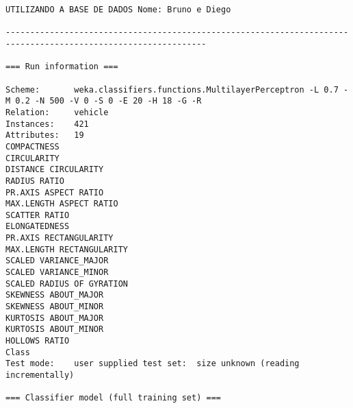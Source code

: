 \documentclass[
	article,			%
	11pt,				%
	oneside,			%
	a4paper,			%
	english,			%
	brazil,				%
	sumario=tradicional
	]{abntex2}
\begin{document}
\begin{lstlisting}
UTILIZANDO A BASE DE DADOS Nome: Bruno e Diego

---------------------------------------------------------------------------------------------------------------

=== Run information ===

Scheme:       weka.classifiers.functions.MultilayerPerceptron -L 0.7 -M 0.2 -N 500 -V 0 -S 0 -E 20 -H 18 -G -R
Relation:     vehicle
Instances:    421
Attributes:   19
COMPACTNESS
CIRCULARITY
DISTANCE CIRCULARITY
RADIUS RATIO
PR.AXIS ASPECT RATIO
MAX.LENGTH ASPECT RATIO
SCATTER RATIO
ELONGATEDNESS
PR.AXIS RECTANGULARITY
MAX.LENGTH RECTANGULARITY
SCALED VARIANCE_MAJOR
SCALED VARIANCE_MINOR
SCALED RADIUS OF GYRATION
SKEWNESS ABOUT_MAJOR
SKEWNESS ABOUT_MINOR
KURTOSIS ABOUT_MAJOR
KURTOSIS ABOUT_MINOR
HOLLOWS RATIO
Class
Test mode:    user supplied test set:  size unknown (reading incrementally)

=== Classifier model (full training set) ===


\end{lstlisting}
\end{document}
